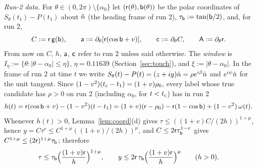 \emph{Run-2 data.} For $\theta\in(0,2\pi)\setminus\{\alpha_0\}$ let $(\mathsf r(\theta),\mathsf b(\theta))$ be the polar coordinates of
$S_\theta(t_1)-P(t_1)$ about $\hat n$ (the heading frame of run 2), $\tau_{\mathsf b}:=\tan(\mathsf b/2)$, and, for run 2,
\[
C:=\mathsf r\,\mathsf g(\mathsf b),\qquad\mathsf a:=\partial_\theta[\mathsf r(\cos\mathsf b+v)],\qquad\mathsf c:=\partial_\theta C,\qquad\mathsf A:=\partial_\theta\mathsf r .
\]
From now on $C$, $h$, $\mathsf a$, $\mathsf c$ refer to run 2 unless said otherwise. The \emph{window} is $I_\eta:=\{\theta:|\theta-\alpha_0|\le\eta\}$,
$\eta=0.11639$ (Section~\ref{sec:touch}), and $\xi:=|\theta-\alpha_0|$. In the frame of run 2 at time $t$ we write $S_\theta(t)-P(t)=(z+iy)\hat n=\rho e^{i\beta}\hat n$
and $e^{i\psi}\hat n$ for the unit tangent. Since $(1-v^2)(t_{\mathrm c}-t_1)=(1+v)\rho_0$, every label whose true candidate has $\rho>0$ on run 2 (including $\alpha_0$, for $t<t_{\mathrm c}$) has in run 2
\begin{equation}\label{eq:h2}
h(t)=\mathsf r(\cos\mathsf b+v)-(1-v^2)(t-t_1)=(1+v)(\mathsf r-\rho_0)-\mathsf r(1-\cos\mathsf b)+(1-v^2)\,\omega(t).
\end{equation}
Whenever $h(t)>0$, Lemma~\ref{lem:coord}(d) gives $\tau\le((1+v)C/(2h))^{1+\mu}$, hence $y=C\tau^v\le C^{1+\mu}((1+v)/(2h))^\mu$, and
$C\le2\mathsf r\tau_{\mathsf b}^{1-v}$ gives $C^{1+\mu}\le(2\mathsf r)^{1+\mu}\tau_{\mathsf b}$; therefore
\begin{equation}\label{eq:tau2}
\tau\le\tau_{\mathsf b}\Bigl(\frac{(1+v)\mathsf r}h\Bigr)^{1+\mu},\qquad y\le2\mathsf r\,\tau_{\mathsf b}\Bigl(\frac{(1+v)\mathsf r}h\Bigr)^{\mu}\qquad(h>0).
\end{equation}
